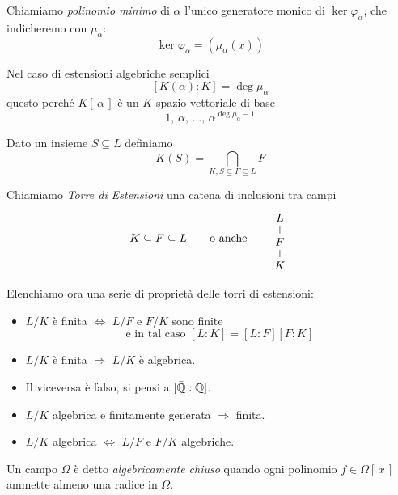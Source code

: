 \begin{multicols}{2}
\begin{definition}
	Chiamiamo \emph{polinomio minimo} di $ \alpha $ l'unico generatore monico di $ \ker\varphi_\alpha $, che indicheremo con $ \mu_\alpha $:
	\[ \ker\varphi_\alpha = (\mu_\alpha(x)) \]
\end{definition}

\begin{remark}
	Nel caso di estensioni algebriche semplici \[ [K(\alpha) : K ] = \deg \mu_\alpha \] questo perché $ K[\,\alpha\,] $ è un $ K $-spazio vettoriale di base $$  1,\, \alpha,\, \dots,\, \alpha^{\deg \mu_\alpha-1}  $$
\end{remark}

\begin{definition}
	Dato un insieme $ S \subseteq L $  definiamo
	\[ K(S) = \bigcap_{K, S \subseteq F \subseteq L} F  \]
\end{definition}

\begin{definition}
	Chiamiamo \emph{Torre di Estensioni} una catena di inclusioni tra campi
	\[ K \subseteq F \subseteq L \qquad\text{o anche}\qquad \begin{tikzcd}[row sep=0.25cm]
	L \arrow [d,-] \\
	F \arrow [d,-] \\
	K
	\end{tikzcd} \]
\end{definition}

Elenchiamo ora una serie di proprietà delle torri di estensioni:

\begin{itemize}
	\item $ L/K $ è finita $ \Leftrightarrow $ $ L/F $ e $ F/K $ sono finite
	\[ \text{e in tal caso } [L : K] = [L : F][F : K] \]
	
	\item $ L/K $ è finita $ \Rightarrow $ $ L/K $ è algebrica.
	
	\item Il viceversa è falso, si pensi a $ [\bar{\mathbb{Q}} : \mathbb{Q}] $.
	
	\item $ L/K $ algebrica e finitamente generata $ \Rightarrow $ finita.
	
	\item $ L/K $ algebrica $ \Leftrightarrow $ $ L/F $ e $ F/K $ algebriche.
	
	
\end{itemize}

\begin{definition}
	Un campo $ \Omega $ è detto \emph{algebricamente chiuso} quando ogni polinomio $ f \in \Omega[\, x\,] $ ammette almeno una radice in $ \Omega $.
\end{definition}


\end{multicols}
